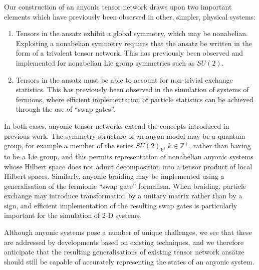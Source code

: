 \documentclass[aps,prb,reprint,superscriptaddress,amsfonts,amsmath,amssymb,showpacs,floatfix]{revtex4-1}
\newcommand{\mbb}[1]{\mathbb{#1}}
\newcommand{\sref}[1]{Sec.~\ref{#1}}
\newcommand{\citecomma}[1]{,\cite{#1}}
\newcommand{\citestop}[1]{.\cite{#1}}
\begin{document}

Our construction of an anyonic tensor network draws upon two important elements which have previously been observed in other, simpler, physical systems:
\begin{enumerate}
\item Tensors in the ansatz exhibit a global symmetry, which may be nonabelian. Exploiting a nonabelian symmetry requires that the ansatz be written in the form of a trivalent tensor network. This has previously been observed and implemented for nonabelian Lie group symmetries such as $SU(2)$\citestop{singh2009}
\item Tensors in the ansatz must be able to account for non-trivial exchange statistics. This has previously been observed in the simulation of systems of fermions\citecomma{corboz2010,kraus2010,pineda2010,corboz2009,barthel2009,shi2009,pizorn2010,gu2010} where efficient implementation of particle statistics can be achieved through the use of ``swap gates''\citestop{pineda2010,corboz2009,barthel2009,pizorn2010} 
\end{enumerate}
In both cases, anyonic tensor networks extend the concepts introduced in previous work. The symmetry structure of an anyon model may be a quantum group, for example a member of the series $SU(2)_k$, $k\in\mbb{Z}^+$, rather than having to be a Lie group, %
and this permits representation of nonabelian anyonic systems whose Hilbert space does not admit decomposition into a tensor product of local Hilbert spaces. Similarly, anyonic braiding may be implemented using a generalisation of the fermionic ``swap gate'' formalism. When braiding, particle exchange may introduce transformation by a unitary matrix rather than by a sign, and efficient implementation of the resulting swap gates is particularly important for the simulation of 2-D systems. 

Although anyonic systems pose a number of unique challenges, we see that these are addressed by developments based on existing techniques, and we therefore anticipate that the resulting generalisations of existing tensor network ans\"atze %
should still be capable of accurately representing the states of an anyonic system.
\end{document}
